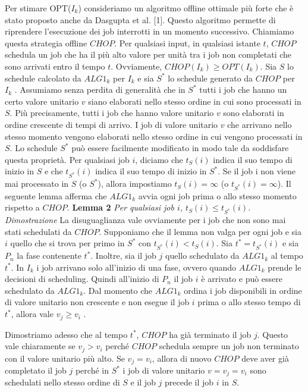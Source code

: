 \documentclass[12pt]{article}
\begin{document}
Per stimare OPT($I_{k}$) consideriamo un algoritmo offline ottimale più forte che è stato proposto anche da Dasgupta et al. [1]. Questo algoritmo permette di riprendere l'esecuzione dei job interrotti in un momento successivo. Chiamiamo questa strategia offline $CHOP$. Per qualsiasi input, in qualsiasi istante $t$, $CHOP$ schedula un job che ha il più alto valore per unità tra i job non completati che sono arrivati entro il tempo $t$. Ovviamente, $CHOP(I_{k}) \geq OPT(I_{k})$. Sia $S$ lo schedule calcolato da $ALG1_{k}$ per $I_{k}$ e sia $S^{*}$ lo schedule generato da $CHOP$ per $I_{k}$ . Assumiamo senza perdita di generalità che in $S^{*}$ tutti i job che hanno un certo valore unitario $v$ siano elaborati nello stesso ordine in cui sono processati in $S$. Più precisamente, tutti i job che hanno valore unitario $v$ sono elaborati in ordine crescente di tempi di arrivo. I job di valore unitario $v$ che arrivano nello stesso momento vengono elaborati nello stesso ordine in cui vengono processati in $S$. Lo schedule $S^{*}$ può essere facilmente modificato in modo tale da soddisfare questa proprietà. Per qualsiasi job $i$, diciamo che $t_{S}(i)$ indica il suo tempo di inizio in $S$ e che $t_{S^{*}}(i)$ indica il suo tempo di inizio in $S^{*}$. Se il job i non viene mai processato in $S$ (o $S^{*}$), allora impostiamo $t_{S}(i) = \infty$ (o $t_{S^{*}} (i) = \infty$). Il seguente lemma afferma che $ALG1_{k}$ avvia ogni job prima o allo stesso momento rispetto a $CHOP$.\newline\newline
\textbf{Lemma 2} 
\textit{Per qualsiasi job $i$, $t_{S}(i) \leq t_{S^{*}}(i)$.}\newline\newline
\textit{Dimostrazione}
La disuguaglianza vale ovviamente per i job che non sono mai stati schedulati da $CHOP$. Supponiamo che il lemma non valga per ogni job e sia $i$ quello che si trova per primo in $S^{*}$ con $t_{S^{*}}(i) < t_{S}(i)$. Sia $t^{*} = t_{S^{*}} (i)$ e sia $P_{n}$ la fase contenente $t^{*}$. Inoltre, sia il job $j$ quello schedulato da $ALG1_{k}$ al tempo $t^{*}$. In $I_{k}$ i job arrivano solo all'inizio di una fase, ovvero quando $ALG1_{k}$ prende le decisioni di scheduling. Quindi all'inizio di $P_{n}$ il job $i$ è arrivato e può essere schedulato da $ALG1_{k}$. Dal momento che $ALG1_{k}$ ordina i job disponibili in ordine di valore unitario non crescente e non esegue il job $i$ prima o allo stesso tempo di $t^{*}$, allora vale $v_{j} \geq v_{i}$ . 

Dimostriamo adesso che al tempo $t^{*}$, $CHOP$ ha già terminato il job $j$. Questo vale chiaramente se $v_{j} > v_{i}$ perché $CHOP$ schedula sempre un job non terminato con il valore unitario più alto. Se $v_{j} = v_{i}$, allora di nuovo $CHOP$ deve aver già completato il job $j$ perché in $S^{*}$ i job di valore unitario $v = v_{j} = v_{i}$ sono schedulati nello stesso ordine di $S$ e il job $j$ precede il job $i$ in $S$. 
\end{document}
